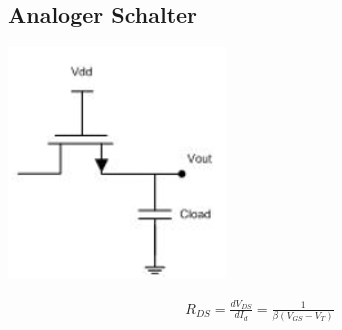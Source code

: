 \subsection{Analoger Schalter}
\begin{minipage}{0.20\textwidth}
\begin{center}
		\includegraphics[width=0.5\linewidth,keepaspectratio=true]{Images/analoger_schalter}
\end{center}
\end{minipage}%
\begin{minipage}{0.30\textwidth}
	\begin{align*}
		R_{DS} = \frac{dV_{DS}}{dI_d} = \frac{1}{\beta (V_{GS} - V_T)}
	\end{align*}
\end{minipage}